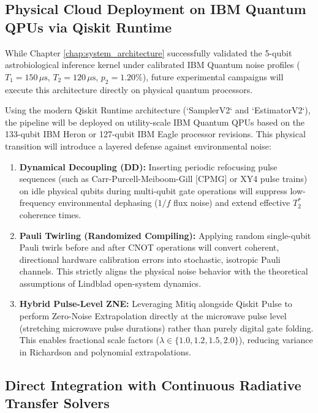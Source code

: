 \subsection{Physical Cloud Deployment on IBM Quantum QPUs via Qiskit Runtime}\label{subsec:future_physical_qpu}

While Chapter \ref{chap:system_architecture} successfully validated the 5-qubit astrobiological inference kernel under calibrated IBM Quantum noise profiles ($T_1 = 150\,\mu\mathrm{s}$, $T_2 = 120\,\mu\mathrm{s}$, $p_2 = 1.20\%$), future experimental campaigns will execute this architecture directly on physical quantum processors.

Using the modern Qiskit Runtime architecture (`SamplerV2` and `EstimatorV2`), the pipeline will be deployed on utility-scale IBM Quantum QPUs based on the 133-qubit IBM Heron or 127-qubit IBM Eagle processor revisions. This physical transition will introduce a layered defense against environmental noise:
\begin{enumerate}
    \item \textbf{Dynamical Decoupling (DD):} Inserting periodic refocusing pulse sequences (such as Carr-Purcell-Meiboom-Gill [CPMG] or XY4 pulse trains) on idle physical qubits during multi-qubit gate operations will suppress low-frequency environmental dephasing ($1/f$ flux noise) and extend effective $T_2^*$ coherence times.
    \item \textbf{Pauli Twirling (Randomized Compiling):} Applying random single-qubit Pauli twirls before and after CNOT operations will convert coherent, directional hardware calibration errors into stochastic, isotropic Pauli channels. This strictly aligns the physical noise behavior with the theoretical assumptions of Lindblad open-system dynamics.
    \item \textbf{Hybrid Pulse-Level ZNE:} Leveraging Mitiq alongside Qiskit Pulse to perform Zero-Noise Extrapolation directly at the microwave pulse level (stretching microwave pulse durations) rather than purely digital gate folding. This enables fractional scale factors ($\lambda \in \{1.0, 1.2, 1.5, 2.0\}$), reducing variance in Richardson and polynomial extrapolations.
\end{enumerate}

\subsection{Direct Integration with Continuous Radiative Transfer Solvers}\label{subsec:future_radiative_transfer}

